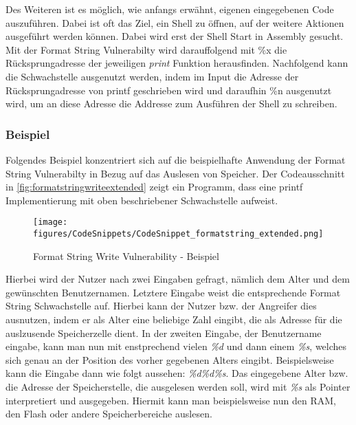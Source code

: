 \documentclass[a4paper,
DIV=13,
12pt,
BCOR=10mm,
department=FakIM,
oneside,
parskip=half,
automark,
listof=totocnumbered,
bibliography=totocnumbered,
acronym=totocnumbered
] {OTHRartcl}
\begin{document}
Des Weiteren ist es möglich, wie anfangs erwähnt, eigenen eingegebenen Code auszuführen. Dabei ist oft das Ziel,
ein Shell zu öffnen, auf der weitere Aktionen ausgeführt werden können.
Dabei wird erst der Shell Start in Assembly gesucht. Mit der Format String Vulnerabilty wird darauffolgend mit \%x die Rücksprungadresse
der jeweiligen \textit{print} Funktion herausfinden. Nachfolgend kann die Schwachstelle ausgenutzt werden, indem im Input die Adresse der Rücksprungadresse von printf geschrieben wird
und daraufhin \%n ausgenutzt wird, um an diese Adresse die Addresse zum Ausführen der Shell zu schreiben. \cite{Format String Exploits}

\subsubsection{Beispiel}
Folgendes Beispiel konzentriert sich auf die beispielhafte Anwendung der Format String Vulnerabilty in Bezug auf das Auslesen von Speicher.
Der Codeausschnitt in \autoref{fig:formatstringwriteextended} zeigt ein Programm, dass eine printf Implementierung mit oben beschriebener Schwachstelle aufweist.
\begin{figure}[ht!]
  \begin{center}
    \texttt{[image: figures/CodeSnippets/CodeSnippet\_formatstring\_extended.png]}
    \caption{Format String Write Vulnerability - Beispiel}
    \label{fig:formatstringwriteextended}
  \end{center}
\end{figure}
Hierbei wird der Nutzer nach zwei Eingaben gefragt, nämlich dem Alter und dem gewünschten Benutzernamen.
Letztere Eingabe weist die entsprechende Format String Schwachstelle auf.
Hierbei kann der Nutzer bzw. der Angreifer dies ausnutzen, indem er als Alter eine beliebige Zahl eingibt, die als Adresse für die auslzusende Speicherzelle dient.
In der zweiten Eingabe, der Benutzername eingabe, kann man nun mit enstprechend vielen \textit{\%d} und dann einem \textit{\%s}, welches sich genau an der Position des
vorher gegebenen Alters eingibt. Beispielsweise kann die Eingabe dann wie folgt aussehen: \textit{\%d\%d\%s}.
Das eingegebene Alter bzw. die Adresse der Speicherstelle, die ausgelesen werden soll, wird mit \textit{\%s} als Pointer interpretiert und ausgegeben.
Hiermit kann man beispielsweise nun den RAM, den Flash oder andere Speicherbereiche auslesen.
\end{document}
